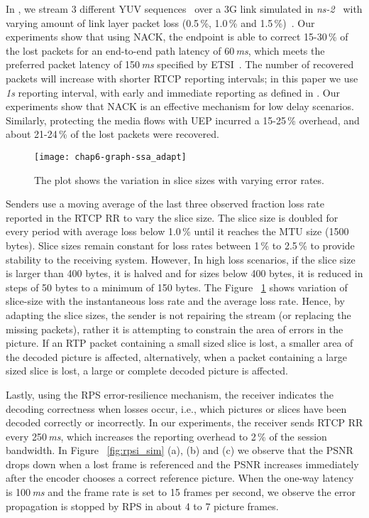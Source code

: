In , we stream 3 different YUV sequences~\cite{YUV_seq} over a
3G link simulated in \emph{ns-2}~\cite{ns2} with varying amount of link layer
packet loss (0.5\,\%, 1.0\,\% and 1.5\,\%)~\cite{3gppSim}. Our experiments
show that using NACK, the endpoint is able to correct 15-30\,\% of the lost
packets for an end-to-end path latency of 60\,\emph{ms}, which meets the
preferred  packet latency of 150\,\emph{ms} specified by ETSI~\cite{etsi.qoe}.
The number of recovered packets will increase with shorter RTCP reporting
intervals; in this paper we use \emph{1s} reporting interval, with early and
immediate reporting as defined in \cite{rfc4585}. Our experiments show that
NACK is an effective mechanism for low delay scenarios. Similarly, protecting
the media flows with UEP incurred a 15-25\,\% overhead, and about 21-24\,\% of
the lost packets were recovered.

\begin{figure}
\centerline {
\texttt{[image: chap6-graph-ssa\_adapt]}
}
\caption{The plot shows the variation in slice sizes with varying error
rates.}
\label{fig:ssa_adapt}
\end{figure}

Senders use a moving average of the last three observed fraction loss rate
reported in the RTCP RR to vary the slice size. The slice size is doubled for
every period with average loss below 1.0\,\% until it reaches the MTU size
(1500 bytes). Slice sizes remain constant for loss rates between 1\,\% to
2.5\,\% to provide stability to the receiving system. However, In high loss
scenarios, if the slice size is larger than 400 bytes, it is halved and for
sizes below 400 bytes, it is reduced in steps of 50 bytes to a minimum of 150
bytes. The Figure ~\ref{fig:ssa_adapt} shows variation of slice-size with the
instantaneous loss rate and the average loss rate. Hence, by adapting the
slice sizes, the sender is not repairing the stream (or replacing the missing
packets), rather it is attempting to constrain the area of errors in the
picture. If an RTP packet containing a small sized slice is lost, a smaller
area of the decoded picture is affected, alternatively, when a packet
containing a large sized slice is lost, a large or complete decoded picture is
affected.

Lastly, using the RPS error-resilience mechanism, the receiver indicates the
decoding correctness when losses occur, i.e., which pictures or slices have
been decoded correctly or incorrectly.  In our experiments, the receiver sends
RTCP RR every 250\,\emph{ms}, which increases the reporting overhead to 2\,\%
of the session bandwidth. In Figure ~\ref{fig:rpsi_sim} (a), (b) and (c) we
observe that the PSNR drops down when a lost frame is referenced and the PSNR
increases immediately after the encoder chooses a correct reference picture.
When the one-way latency is 100\,\emph{ms} and the frame rate is set to 15
frames per second, we observe the error propagation is stopped by RPS in about
4 to 7 picture frames.


